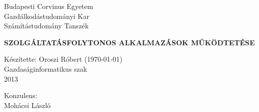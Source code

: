 \begin{raggedright}
Budapesti Corvinus Egyetem \\
Gazdálkodástudományi Kar \\
{\small Számítástudomány Tanszék}
\end{raggedright}

\thispagestyle{empty}

\vspace{3.5cm}

\vspace{0.8cm}
\begin{center}
\textbf{\Large SZOLGÁLTATÁSFOLYTONOS ALKALMAZÁSOK MŰKÖDTETÉSE}
\end{center}

\vfill
\begin{raggedleft}
Készítette: Oroszi Róbert (\today)\\
Gazdaságinformatikus szak\\
2013\\
\end{raggedleft}
\begin{raggedright}
{\Large Konzulens:}\\ Mohácsi László
\end{raggedright}
\vspace{0.6cm}


\clearpage











